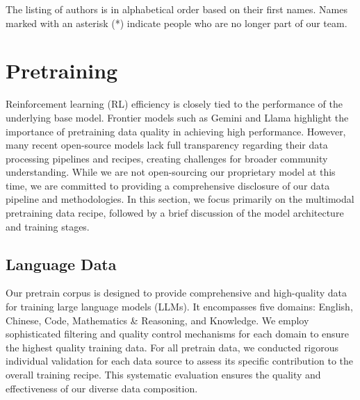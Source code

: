 \documentclass{article}
\newcommand{\citep}[1]{\parencite{#1}}
\begin{document}
The listing of authors is in alphabetical order based on their first names. Names marked with an asterisk (*) indicate people who are no longer part of our team.



\section{Pretraining}
\label{appendix:pretrain}

Reinforcement learning (RL) efficiency is closely tied to the performance of the underlying base model.
Frontier models such as Gemini\citep{geminiteam2024geminifamilyhighlycapable} and Llama\citep{grattafiori2024llama3herdmodels} highlight the importance of pretraining data quality in achieving high performance. 
However, many recent open-source models lack full transparency regarding their data processing pipelines and recipes, creating challenges for broader community understanding. While we are not open-sourcing our proprietary model at this time, we are committed to providing a comprehensive disclosure of our data pipeline and methodologies. In this section, we focus primarily on the multimodal pretraining data recipe, followed by a brief discussion of the model architecture and training stages.

\subsection{Language Data}

Our pretrain corpus is designed to provide comprehensive and high-quality data for training large language models (LLMs). It encompasses five domains: English, Chinese, Code, Mathematics \& Reasoning, and Knowledge. 
We employ sophisticated filtering and quality control mechanisms for each domain to ensure the highest quality training data. For all pretrain data, we conducted rigorous individual validation for each data source to assess its specific contribution to the overall training recipe. This systematic evaluation ensures the quality and effectiveness of our diverse data composition.
\end{document}
